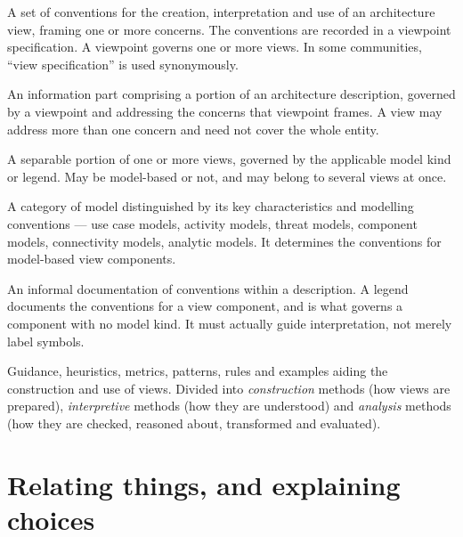 \documentclass[11pt,a4paper]{report}
\begin{document}
\begin{description}[style=nextline,leftmargin=6mm,labelindent=0pt,font=\sffamily\bfseries\color{navy}]
\item[Architecture viewpoint]
  A set of conventions for the creation, interpretation and use of an
  architecture view, framing one or more concerns. The conventions are recorded
  in a viewpoint specification. A viewpoint governs one or more views. In some
  communities, ``view specification'' is used synonymously.
\item[Architecture view]
  An information part comprising a portion of an architecture description,
  governed by a viewpoint and addressing the concerns that viewpoint frames. A
  view may address more than one concern and need not cover the whole entity.
\item[View component]
  A separable portion of one or more views, governed by the applicable model
  kind or legend. May be model-based or not, and may belong to several views at
  once.
\item[Model kind]
  A category of model distinguished by its key characteristics and modelling
  conventions --- use case models, activity models, threat models, component
  models, connectivity models, analytic models. It determines the conventions
  for model-based view components.
\item[Legend]
  An informal documentation of conventions within a description. A legend
  documents the conventions for a view component, and is what governs a
  component with no model kind. It must actually guide interpretation, not
  merely label symbols.
\item[View method]
  Guidance, heuristics, metrics, patterns, rules and examples aiding the
  construction and use of views. Divided into \emph{construction} methods (how
  views are prepared), \emph{interpretive} methods (how they are understood) and
  \emph{analysis} methods (how they are checked, reasoned about, transformed and
  evaluated).
\end{description}

\section{Relating things, and explaining choices}
\end{document}
